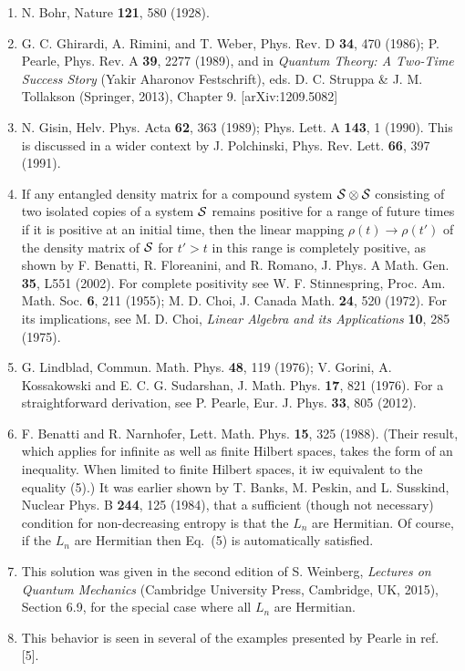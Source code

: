 \documentclass[12pt]{article}
\begin{document}
\begin{enumerate}


\item N. Bohr, Nature {\bf 121}, 580 (1928).
\item G. C. Ghirardi, A. Rimini,
and T. Weber, Phys. Rev. D {\bf 34}, 470 (1986);  P. Pearle, Phys. Rev. A {\bf 39}, 2277 (1989), and in {\em Quantum Theory: A Two-Time Success Story} (Yakir Aharonov Festschrift), eds. D. C. Struppa \& J. M. Tollakson (Springer, 2013), Chapter 9. [arXiv:1209.5082]
\item N. Gisin, Helv. Phys. Acta {\bf 62}, 363 (1989); Phys. Lett. A {\bf 143}, 1 (1990).  This is discussed in a wider context by J. Polchinski, Phys. Rev. Lett. {\bf 66}, 397 (1991).
\item  If any entangled density matrix for a compound system ${\cal S}\otimes {\cal S}$ consisting of two isolated copies of a system ${\cal S}$ remains positive for a  range of future times if it is positive at an initial time, then the linear mapping $\rho(t)\rightarrow\rho(t')$ of the density matrix of ${\cal S}$  for $t'>t$ in this range is completely positive,  as shown by F. Benatti, R. Floreanini, and R. Romano,  J. Phys. A Math. Gen.  {\bf 35}, L551 (2002).  For complete positivity see W. F. Stinnespring, Proc. Am. Math. Soc. {\bf 6}, 211 (1955); M. D. Choi, J. Canada Math. {\bf 24}, 520 (1972).  For its  implications, see  M. D. Choi, {\it Linear Algebra and its Applications} {\bf 10}, 285 (1975).  
\item G. Lindblad, Commun. Math. Phys. {\bf 48}, 119 (1976); V. Gorini, A. Kossakowski and E. C. G. Sudarshan, J. Math. Phys. {\bf 17}, 821 (1976).  For a straightforward derivation, see P. Pearle, Eur. J. Phys. {\bf 33}, 805 (2012).
\item F. Benatti and R. Narnhofer, Lett. Math. Phys. {\bf 15}, 325 (1988).  (Their result, which applies for infinite as well as finite Hilbert spaces, takes the form of an inequality.  When limited to finite Hilbert spaces, it iw equivalent to  the equality (5).)  It was earlier shown by T. Banks, M. Peskin, and L. Susskind, Nuclear Phys. B {\bf 244}, 125 (1984), that a sufficient (though not necessary) condition for non-decreasing entropy is that the $L_n$ are Hermitian.  Of course, if the $L_n$ are Hermitian then Eq.~(5) is automatically satisfied.
\item This solution was  given in the second edition of S. Weinberg, {\em Lectures on Quantum Mechanics} (Cambridge University Press, Cambridge, UK, 2015), Section 6.9, for the special case where all $L_n$ are Hermitian.
\item This behavior is seen in several of the examples presented by Pearle in ref. [5].
\end{enumerate}

  
\end{document}
